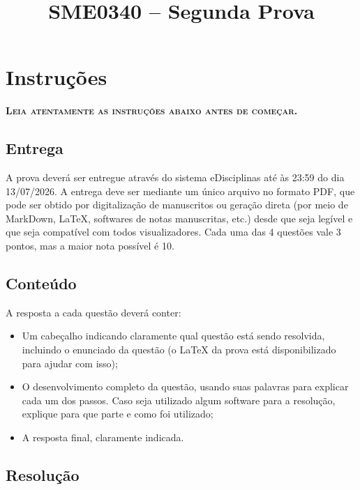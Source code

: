 \documentclass[oneside,12pt,a4paper]{article}
\title{SME0340 -- Segunda Prova}
\date{}
\author{}
\begin{document}
    \maketitle

    \section*{Instruções}

    \vspace*{0.5em}
    \textbf{\textsc{Leia atentamente as instruções abaixo antes de começar.}}

    \subsection*{Entrega}

    A prova deverá ser entregue através do sistema eDisciplinas até às 23:59 do dia 13/07/2026. A entrega deve ser mediante um único arquivo no formato PDF, que pode ser obtido por digitalização de manuscritos ou geração direta (por meio de MarkDown, LaTeX, softwares de notas manuscritas, etc.) desde que seja legível e que seja compatível com todos visualizadores. Cada uma das 4 questões vale 3 pontos, mas a maior nota possível é 10.

    \subsection*{Conteúdo}

    A resposta a cada questão deverá conter:
    \begin{itemize}
        \item Um cabeçalho indicando claramente qual questão está sendo resolvida, incluindo o enunciado da questão (o LaTeX da prova está disponibilizado para ajudar com isso);

        \item O desenvolvimento completo da questão, usando suas palavras para explicar cada um dos passos. Caso seja utilizado algum software para a resolução, explique para que parte e como foi utilizado;

        \item A resposta final, claramente indicada.
    \end{itemize}

    \subsection*{Resolução}
\end{document}
